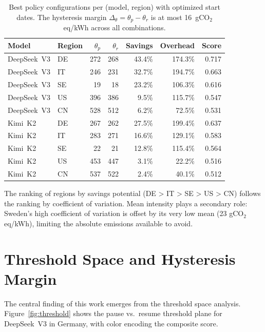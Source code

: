     \begin{table}
    \centering
    \caption{Best policy configurations per (model, region) with optimized
    start dates.  The hysteresis margin $\Delta_\theta = \theta_p - \theta_r$
    is at most 16~gCO$_2$eq/kWh across all combinations.}
    \label{tab:best}
    \small
    \begin{tabular}{llrrrrr}
      \toprule
      Model & Region & $\theta_p$ & $\theta_r$ & Savings & Overhead & Score \\
      \midrule
      DeepSeek~V3 & DE & 272 & 268 & 43.4\% & 174.3\% & 0.717 \\
      DeepSeek~V3 & IT & 246 & 231 & 32.7\% & 194.7\% & 0.663 \\
      DeepSeek~V3 & SE &  19 &  18 & 23.2\% & 106.3\% & 0.616 \\
      DeepSeek~V3 & US & 396 & 386 &  9.5\% & 115.7\% & 0.547 \\
      DeepSeek~V3 & CN & 528 & 512 &  6.2\% &  72.5\% & 0.531 \\
      \midrule
      Kimi~K2 & DE & 267 & 262 & 27.5\% & 199.4\% & 0.637 \\
      Kimi~K2 & IT & 283 & 271 & 16.6\% & 129.1\% & 0.583 \\
      Kimi~K2 & SE &  22 &  21 & 12.8\% & 115.4\% & 0.564 \\
      Kimi~K2 & US & 453 & 447 &  3.1\% &  22.2\% & 0.516 \\
      Kimi~K2 & CN & 537 & 522 &  2.4\% &  40.1\% & 0.512 \\
      \bottomrule
    \end{tabular}
\end{table}

The ranking of regions by savings potential (DE > IT > SE > US > CN) follows
the ranking by coefficient of variation.  Mean intensity plays a
secondary role: Sweden's high coefficient of variation is offset by its very low mean (23
gCO$_2$eq/kWh), limiting the absolute emissions available to avoid.

\section{Threshold Space and Hysteresis Margin}
\label{sec:threshold-space}

The central finding of this work emerges from the threshold space analysis.
Figure~\ref{fig:threshold} shows the pause vs.\ resume threshold plane for
DeepSeek~V3 in Germany, with color encoding the composite score.

